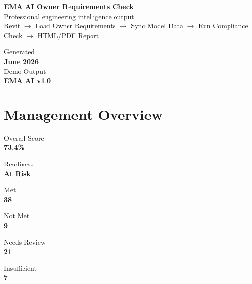 \documentclass[10pt,letterpaper]{article}
\newcommand{\metriccard}[3]{%
\begin{tcolorbox}[height=0.76in]
  {\scriptsize\textcolor{emaMuted}{#1}}\\[-1pt]
  {\Large\bfseries\textcolor{#3}{#2}}
\end{tcolorbox}}
\begin{document}
\color{emaText}

\begin{tcolorbox}[colback=white,colframe=emaLine,boxrule=0.7pt,arc=4mm,left=12pt,right=12pt,top=12pt,bottom=12pt]
\begin{minipage}[t]{0.67\textwidth}
  {\Huge\bfseries\textcolor{emaNavy}{EMA AI Owner Requirements Check}}\\[4pt]
  {\large\textcolor{emaMuted}{Professional engineering intelligence output}}\\[8pt]
  \textcolor{emaMuted}{Revit $\rightarrow$ Load Owner Requirements $\rightarrow$ Sync Model Data $\rightarrow$ Run Compliance Check $\rightarrow$ HTML/PDF Report}
\end{minipage}
\hfill
\begin{minipage}[t]{0.29\textwidth}
  \raggedleft
  {\small\textcolor{emaMuted}{Generated}}\\
  {\bfseries June 2026}\\[4pt]
  {\small\textcolor{emaMuted}{Demo Output}}\\
  {\bfseries EMA AI v1.0}
\end{minipage}
\end{tcolorbox}

\section*{Management Overview}

\begin{minipage}[t]{0.15\textwidth}\metriccard{Overall Score}{73.4\%}{emaBlue}\end{minipage}\hfill
\begin{minipage}[t]{0.15\textwidth}\metriccard{Readiness}{At Risk}{emaAmber}\end{minipage}\hfill
\begin{minipage}[t]{0.15\textwidth}\metriccard{Met}{38}{emaGreen}\end{minipage}\hfill
\begin{minipage}[t]{0.15\textwidth}\metriccard{Not Met}{9}{emaRed}\end{minipage}\hfill
\begin{minipage}[t]{0.15\textwidth}\metriccard{Needs Review}{21}{emaAmber}\end{minipage}\hfill
\begin{minipage}[t]{0.15\textwidth}\metriccard{Insufficient}{7}{emaPurple}\end{minipage}
\end{document}
